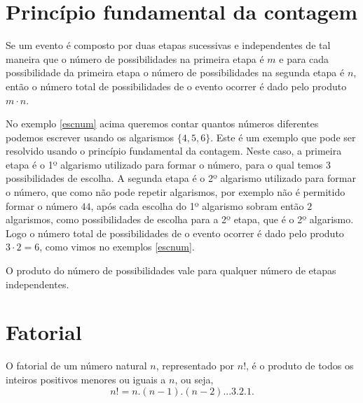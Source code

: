 \section{Princípio fundamental da contagem}

 \vskip0.3cm
 \colorbox{azul}{
 \begin{minipage}{0.9\linewidth}
 \begin{center}
  Se um evento é composto por duas etapas sucessivas e independentes de tal maneira que o número de possibilidades na primeira etapa é $m$ e para cada possibilidade da primeira etapa o número de possibilidades na segunda etapa é $n$, então o número total de possibilidades de o evento ocorrer é dado pelo produto $m \cdot n$.
 \end{center}
 \end{minipage}}
 \vskip0.3cm

No exemplo \ref{escnum} acima queremos contar quantos números diferentes podemos escrever usando os algarismos $\{4,5,6\}$. Este é um exemplo que pode ser resolvido usando o princípio fundamental da contagem. Neste caso, a primeira etapa é o 1º algarismo utilizado para formar o número, para o qual temos $3$ possibilidades de escolha. A segunda etapa é o 2º algarismo utilizado para formar o número, que como não pode repetir algarismos, por exemplo não é permitido formar o número $44$, após cada escolha do 1º algarismo sobram então $2$ algarismos, como possibilidades de escolha para a 2º etapa, que é o 2º algarismo. Logo o número total de possibilidades de o evento ocorrer é dado pelo produto $3 \cdot 2= 6$, como vimos no exemplos \ref{escnum}.

\begin{obs}
 O produto do número de possibilidades vale para qualquer número de etapas independentes.
\end{obs}


\section{Fatorial}

\vskip0.3cm
 \colorbox{azul}{
 \begin{minipage}{0.9\linewidth}
 \begin{center}
  O fatorial de um número natural $n$, representado por $n!$, é o produto de todos os inteiros positivos menores ou iguais a $n$, ou seja,
 \[n! = n.(n-1).(n-2)...3.2.1. \]
 \end{center}
 \end{minipage}}
 \vskip0.3cm

